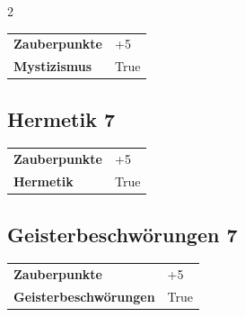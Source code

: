 \begin{multicols}{2}
\begin{tcolorbox}
\begin{tabular}{@{}ll@{}}
    \textbf{Zauberpunkte} & +5\\
    \textbf{Mystizismus} & True\\
\end{tabular}


\end{tcolorbox}

\begin{tcolorbox}
    \subsection*{Hermetik \hfill \small{7 }}
    \tcblower




\begin{tabular}{@{}ll@{}}
    \textbf{Zauberpunkte} & +5\\
    \textbf{Hermetik} & True\\
\end{tabular}


\end{tcolorbox}

\begin{tcolorbox}
    \subsection*{Geisterbeschwörungen \hfill \small{7 }}
    \tcblower




\begin{tabular}{@{}ll@{}}
    \textbf{Zauberpunkte} & +5\\
    \textbf{Geisterbeschwörungen} & True\\
\end{tabular}


\end{tcolorbox}

\begin{tcolorbox}

\end{tcolorbox}
\end{multicols}
